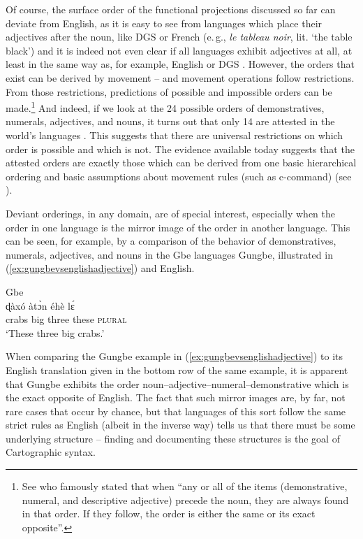 Of course, the surface order of the  functional projections discussed so far can deviate from English, as it is easy to see from languages which place their adjectives after the noun, like DGS or French (e.\,g., \textit{le tableau noir}, lit. `the table black') and it is indeed not even clear if all languages exhibit adjectives at all, at least in the same way as, for example, English or DGS \citep{croft1991syntactic,dixon2004adjective}. However, the orders that exist can be derived by movement -- and movement operations follow restrictions. From those restrictions, predictions of possible and impossible orders can be made.\footnote{ See \citet[87]{greenberg1963some} who famously stated that when ``any or all of the items (demonstrative, numeral, and descriptive adjective) precede the noun, they are always found in that order. If they follow, the order is either the same or its exact opposite''. } 
And indeed, if we look at the 24 possible orders of demonstratives, numerals, adjectives, and nouns, it turns out that only 14 are attested in the world's languages \citep{cinque2006restructuring,abels2009universal}. This suggests that there are universal restrictions on which order is possible and which is not. The evidence available today suggests that the attested orders are exactly those which can be derived from one basic hierarchical ordering and basic assumptions about movement rules (such as c-command) (see \citealt{medeiros2012movement}). 

Deviant orderings, in any domain, are of special interest, especially when the order in one language is the mirror image of the order in another language. This can be seen, for example, by a comparison of the behavior of demonstratives, numerals, adjectives, and nouns in the Gbe languages Gungbe, illustrated in (\ref{ex:gungbevsenglishadjective}) and English.

\begin{exe}
\ex Gbe \citep[92]{aboh2004morphosyntax} \\
 {ɖàxó} {àtɔ̀n} {éhè} {lɛ́} \\
{crabs} {big} {three} {these} {\textsc{plural}} \\
\trans `These three big crabs.' \label{ex:gungbevsenglishadjective}
\end{exe} 


\noindent When comparing the Gungbe example in (\ref{ex:gungbevsenglishadjective}) to its English translation given in the bottom row of the same example, it is apparent that Gungbe exhibits the order noun--adjective--numeral--demonstrative which is the exact opposite of English. The fact that such mirror images are, by far, not rare cases that occur by chance, but that languages of this sort follow the same strict rules as English (albeit in the inverse way) tells us that there must be some underlying structure -- finding and documenting these structures is the goal of Cartographic syntax.


